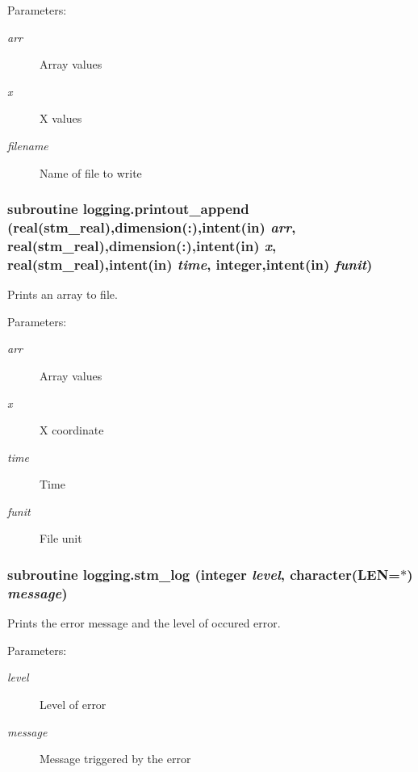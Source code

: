 \begin{Desc}
\item[Parameters:]
\begin{description}
\item[{\em arr}]Array values\item[{\em x}]X values\item[{\em filename}]Name of file to write \end{description}
\end{Desc}
\hypertarget{a00065_6966605901ff13e951cea8f6853cf41b}{
\subsubsection[{printout\_\-append}]{\setlength{\rightskip}{0pt plus 5cm}subroutine logging.printout\_\-append (real(stm\_\-real),dimension(:),intent(in) {\em arr}, \/  real(stm\_\-real),dimension(:),intent(in) {\em x}, \/  real(stm\_\-real),intent(in) {\em time}, \/  integer,intent(in) {\em funit})}}
\label{a00065_6966605901ff13e951cea8f6853cf41b}


Prints an array to file. 

\begin{Desc}
\item[Parameters:]
\begin{description}
\item[{\em arr}]Array values\item[{\em x}]X coordinate\item[{\em time}]Time\item[{\em funit}]File unit \end{description}
\end{Desc}
\hypertarget{a00065_b4fd0509a85809a15a217efeacc0b345}{
\subsubsection[{stm\_\-log}]{\setlength{\rightskip}{0pt plus 5cm}subroutine logging.stm\_\-log (integer {\em level}, \/  character(LEN=$\ast$) {\em message})}}
\label{a00065_b4fd0509a85809a15a217efeacc0b345}


Prints the error message and the level of occured error. 

\begin{Desc}
\item[Parameters:]
\begin{description}
\item[{\em level}]Level of error\item[{\em message}]Message triggered by the error \end{description}
\end{Desc}
